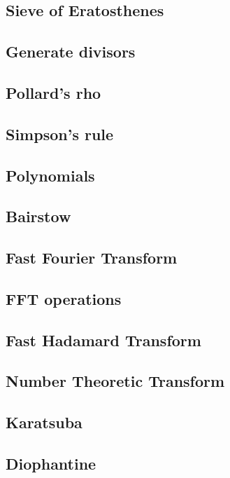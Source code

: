 \subsection{Sieve of Eratosthenes}
\subsection{Generate divisors}
\subsection{Pollard's rho}
\subsection{Simpson's rule}
\subsection{Polynomials}
\subsection{Bairstow}
\subsection{Fast Fourier Transform}
\subsection{FFT operations}
\subsection{Fast Hadamard Transform}
\subsection{Number Theoretic Transform}
\subsection{Karatsuba}
\subsection{Diophantine}
